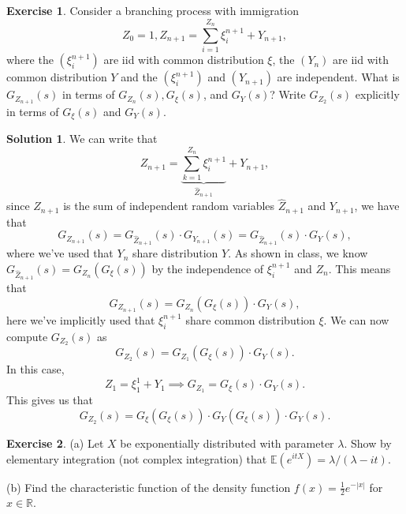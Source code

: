 \documentclass[12pt]{article}
\newcommand{\bbR}{\mathbb{R}}
\newcommand{\abs}[1]{ \left| #1 \right| }
\newcommand{\Expect}{\mathbb{E}}
\theoremstyle{definition}
\newtheorem{exer}{Exercise}
\newtheorem{sol}{Solution}
\theoremstyle{remark}
\begin{document}
  \newpage

\begin{exer}
Consider a branching process with immigration
\begin{equation*}
Z_{0} = 1, Z_{n+1} = \sum_{i=1}^{Z_n} \xi_{i}^{n+1} + Y_{n+1},
\end{equation*}
where the $(\xi_{i}^{n+1})$ are iid with common distribution $\xi$, the $(Y_n)$ are iid with common distribution  $Y$ and the  $(\xi_{i}^{n+1})$ and $(Y_{n+1})$ are independent. What is $G_{Z_{n+1}}(s)$ in terms of $G_{Z_{n}}(s), G_{\xi}(s)$, and $G_{Y}(s)$? Write $G_{Z_{2}}(s)$ explicitly in terms of $G_{\xi}(s)$ and $G_{Y}(s)$. 
\end{exer}

\begin{sol}
We can write that 
\begin{equation*}
    Z_{n+1} = \underbrace{\sum_{k=1}^{Z_{n}} \xi_{i}^{n+1}}_{\hat{Z}_{n+1}} + Y_{n+1} ,
\end{equation*}
since $Z_{n+1}$ is the sum of independent random variables $\hat{Z}_{n+1}$ and $Y_{n+1}$, we have that
\begin{equation*}
    G_{Z_{n+1}}(s) = G_{\hat{Z}_{n+1}}(s) \cdot G_{Y_{n+1}}(s) =  G_{\hat{Z}_{n+1}}(s) \cdot G_{Y}(s),
\end{equation*}
where we've used that $Y_n$ share distribution $Y$. As shown in class, we know $ G_{\hat{Z}_{n+1}}(s) = G_{Z_{n}}(G_{\xi}(s))$ by the independence of $\xi_{i}^{n+1}$ and $Z_{n}$. This means that
\begin{equation*}
    G_{Z_{n+1}}(s) = G_{Z_{n}}(G_{\xi}(s)) \cdot G_{Y}(s),
\end{equation*}
here we've implicitly used that $\xi_{i}^{n+1}$ share common distribution $\xi$. We can now compute $G_{Z_{2}}(s)$ as
\begin{equation*}
    G_{Z_{2}}(s) = G_{Z_{1}}(G_{\xi}(s)) \cdot G_{Y}(s).
\end{equation*}
In this case, 
\begin{equation*}
    Z_{1} = \xi_{1}^{1} + Y_{1} \implies G_{Z_{1}} =  G_{\xi}(s)\cdot G_{Y}(s).
\end{equation*}
This gives us that
\begin{equation*}
    G_{Z_{2}}(s) = G_{\xi}(G_{\xi}(s))\cdot G_{Y}(G_{\xi}(s)) \cdot G_{Y}(s).
\end{equation*}
\end{sol}

\newpage 

\begin{exer}
    (a) Let $X$ be exponentially distributed with parameter $\lambda$. Show by elementary integration (not complex integration) that $\Expect(e^{itX}) = \lambda / (\lambda - it)$.

    (b) Find the characteristic function of the density function $f(x) = \frac{1}{2} e^{-\abs{x}}$ for $x\in\bbR$.
 \end{exer}
\end{document}
